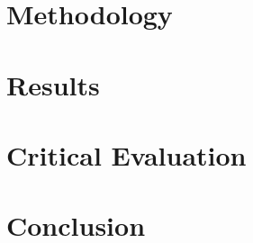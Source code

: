 \documentclass[a4paper, 12pt, hidelinks]{article}
\begin{document}
	\section{Methodology}
	
	\newpage	
	\section{Results}
	\newpage
	\section{Critical Evaluation}
	\newpage
	\section{Conclusion}
	\newpage
		
	\newpage
	\printacronyms
	\printglossary[type=main]
	\clearpage
	\appendix
	\thispagestyle{empty}
\end{document}
